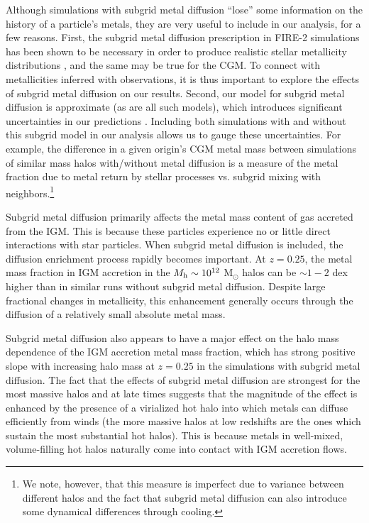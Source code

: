 \documentclass[fleqn,usenatbib]{mnras}
\begin{document}
Although simulations with subgrid metal diffusion ``lose'' some information on the history of a particle's metals, they are very useful to include in our analysis, for a few reasons.
First, the subgrid metal diffusion prescription in FIRE-2 simulations has been shown to be necessary in order to produce realistic stellar metallicity distributions \citep[][]{Escala2018}, and the same may be true for the CGM. To connect with metallicities inferred with observations, it is thus important to explore the effects of subgrid metal diffusion on our results. 
Second, our model for subgrid metal diffusion is approximate (as are all such models), which introduces significant uncertainties in our predictions \citep[e.g.][]{Rennehan2018}. 
Including both simulations with and without this subgrid model in our analysis allows us to gauge these uncertainties. For example, the difference in a given origin's CGM metal mass between simulations of similar mass halos with/without metal diffusion is a measure of the metal fraction due to metal return by stellar processes vs. subgrid mixing with neighbors.\footnote{We note, however, that this measure is imperfect due to variance between different halos and the fact that subgrid metal diffusion can also introduce some dynamical differences through cooling.}

Subgrid metal diffusion primarily affects the metal mass content of gas accreted from the IGM. 
This is because these particles experience no or little direct interactions with star particles. 
When subgrid metal diffusion is included, the diffusion enrichment process rapidly becomes important.
At $z=0.25$, the metal mass fraction in IGM accretion in the $M_{\rm h}\sim 10^{12}$ M$_{\odot}$ halos can be $\sim 1-2$ dex higher than in similar runs without subgrid metal diffusion.
Despite large fractional changes in metallicity, this enhancement generally occurs through the diffusion of a relatively small absolute metal mass.

Subgrid metal diffusion also appears to have a major effect on the halo mass dependence of the IGM accretion metal mass fraction, which has strong positive slope with increasing halo mass at $z=0.25$ in the simulations with subgrid metal diffusion. 
The fact that the effects of subgrid metal diffusion are strongest for the most massive halos and at late times suggests that the magnitude of the effect is enhanced by the presence of a virialized hot halo into which metals can diffuse efficiently from winds (the more massive halos at low redshifts are the ones which sustain the most substantial hot halos).
This is because metals in well-mixed, volume-filling hot halos naturally come into contact with IGM accretion flows.
\end{document}
